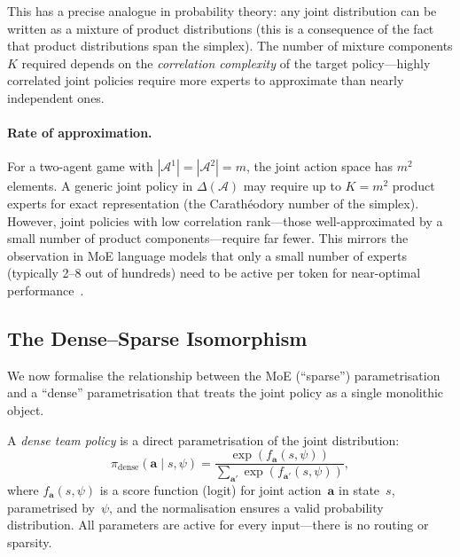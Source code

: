 This has a precise analogue in probability theory: any joint distribution can be written as a mixture of product distributions (this is a consequence of the fact that product distributions span the simplex). The number of mixture components $K$ required depends on the \emph{correlation complexity} of the target policy---highly correlated joint policies require more experts to approximate than nearly independent ones.

\paragraph{Rate of approximation.} For a two-agent game with $|\mathcal{A}^1|=|\mathcal{A}^2|=m$, the joint action space has $m^2$ elements. A generic joint policy in $\Delta(\bm{\mathcal{A}})$ may require up to $K=m^2$ product experts for exact representation (the Carathéodory number of the simplex). However, joint policies with low correlation rank---those well-approximated by a small number of product components---require far fewer. This mirrors the observation in MoE language models that only a small number of experts (typically 2--8 out of hundreds) need to be active per token for near-optimal performance~\cite{deepseekv3}.

\subsection{The Dense--Sparse Isomorphism}
\label{subsec:dense-sparse-iso}

We now formalise the relationship between the MoE (``sparse'') parametrisation and a ``dense'' parametrisation that treats the joint policy as a single monolithic object.

\begin{definition}\label{def:dense-param}
A \emph{dense team policy} is a direct parametrisation of the joint distribution:
\begin{equation}\label{eq:dense-policy}
  \pi_{\mathrm{dense}}(\bm{a}\mid s,\psi) = \frac{\exp(f_{\bm{a}}(s,\psi))}{\sum_{\bm{a}'}\exp(f_{\bm{a}'}(s,\psi))},
\end{equation}
where $f_{\bm{a}}(s,\psi)$ is a score function (logit) for joint action~$\bm{a}$ in state~$s$, parametrised by~$\psi$, and the normalisation ensures a valid probability distribution. All parameters are active for every input---there is no routing or sparsity.
\end{definition}


